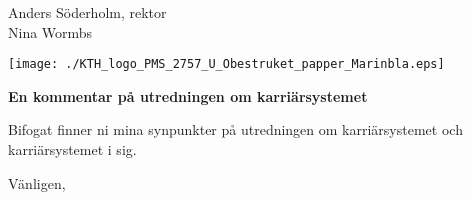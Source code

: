 \documentclass[a4paper]{letter}
\begin{document}
\begin{letter}{Anders Söderholm, rektor\\[0.5em]
  Nina Wormbs
}
\vspace*{-25em}
\begin{center}
  \texttt{[image: ./KTH\_logo\_PMS\_2757\_U\_Obestruket\_papper\_Marinbla.eps]}
\end{center}
\vspace*{10em}
  \opening{\textbf{En kommentar på utredningen om karriärsystemet}}

  Bifogat finner ni mina synpunkter på utredningen om karriärsystemet och 
  karriärsystemet i sig.

  \closing{Vänligen,}

\end{letter}

\end{document}
